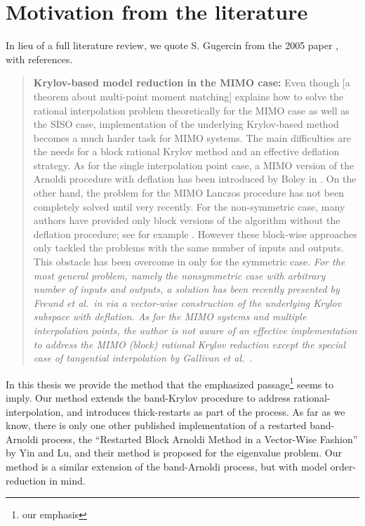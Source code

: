 \section{Motivation from the literature}
In lieu of a full literature review, we quote S. Gugercin  from the 2005 paper \cite{gugercin2005iterative}, with references.
\begin{quote}
\singlespacing
 \textbf{Krylov-based model reduction in the MIMO case:} Even though [a theorem about multi-point moment matching] explains how to solve the
rational interpolation problem theoretically for the MIMO case as well as the SISO case, implementation of the
underlying Krylov-based method becomes a much harder task for MIMO systems. The main difficulties are the
needs for a block rational Krylov method and an effective deflation strategy. As for the single interpolation point
case, a MIMO version of the Arnoldi procedure with deflation has been introduced by Boley in \cite{boley1994krylov}. On the
other hand, the problem for the MIMO Lanczos procedure has not been completely solved until very recently. For
the non-symmetric case, many authors have provided only block versions of the algorithm without the deflation
procedure; see for example \cite{bai1999able,kim1988structural,o1980block}. However these block-wise approaches only tackled the problems with the
same number of inputs and outputs. This obstacle has been overcome in \cite{ruhe1979bLanczos,nikishin1995variable,cullum1974block} only for the symmetric case.
\emph{For the most general problem, namely the nonsymmetric case with arbitrary number of inputs and outputs, a
solution has been recently presented by Freund et al.\ in \cite{AliagaMIMO} via a vector-wise construction of the underlying
Krylov subspace with deflation. As for the MIMO systems and multiple interpolation points, the author is not
aware of an effective implementation to address the MIMO (block) rational Krylov reduction except the special
case of tangential interpolation by Gallivan et al.\ \cite{gallivan2004model}}.
\end{quote}

In this thesis we provide the method that the emphasized passage\footnote{our emphasis} seems to imply.  Our method extends the band-Krylov procedure \cite{AliagaMIMO} to address rational-interpolation, and introduces thick-restarts as part of the process.    As far as we know, there is only one other published implementation of a restarted band-Arnoldi process, the ``Restarted Block Arnoldi Method
in a Vector-Wise Fashion'' \cite{band_IRA} by Yin and Lu, and their method is proposed for the eigenvalue problem.   Our method is a similar extension of the band-Arnoldi process, but with model order-reduction in mind.   

